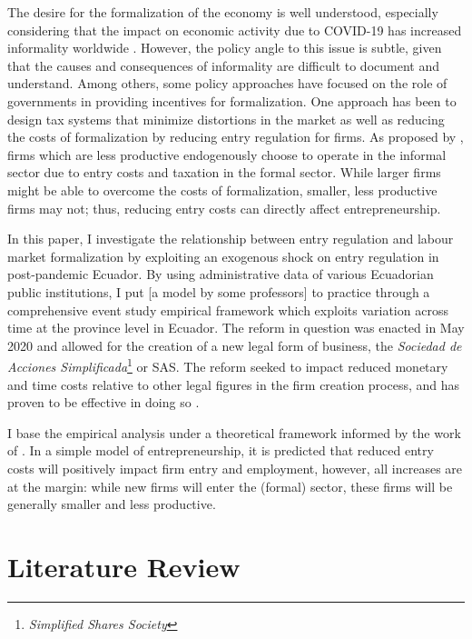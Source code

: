 \documentclass[12pt,a4paper]{article}\usepackage[]{graphicx}\usepackage[]{xcolor}
\begin{document}
The desire for the formalization of the economy is well understood, especially considering that the impact on economic activity due to COVID-19 has increased informality worldwide \parencite{ILO.2022}. However, the policy angle to this issue is subtle, given that the causes and consequences of informality are difficult to document and understand. Among others, some policy approaches have focused on the role of governments in providing incentives for formalization. One approach has been to design tax systems that minimize distortions in the market \parencite{Bardey.2019} as well as reducing the costs of formalization by reducing entry regulation for firms. As proposed by \textcite{MauricioPrado.2011}, firms which are less productive endogenously choose to operate in the informal sector due to entry costs and taxation in the formal sector. While larger firms might be able to overcome the costs of formalization, smaller, less productive firms may not; thus, reducing entry costs can directly affect entrepreneurship.

In this paper, I investigate the relationship between entry regulation and labour market formalization by exploiting an exogenous shock on entry regulation in post-pandemic Ecuador. By using administrative data of various Ecuadorian public institutions, I put [a model by some professors] to practice through a comprehensive event study empirical framework which exploits variation across time at the province level in Ecuador. The reform in question was enacted in May 2020 and allowed for the creation of a new legal form of business, the \textit{Sociedad de Acciones Simplificada}\footnote{\textit{Simplified Shares Society}} or SAS. The reform seeked to impact reduced monetary and time costs relative to other legal figures in the firm creation process, and has proven to be effective in doing so \textcite{CaminoMogro.2022}. 

I base the empirical analysis under a theoretical framework informed by the work of \textcite{Branstetter.2014}. In a simple model of entrepreneurship, it is predicted that reduced entry costs will positively impact firm entry and employment, however, all increases are at the margin: while new firms will enter the (formal) sector, these firms will be generally smaller and less productive. 





\section{Literature Review}

\end{document}
